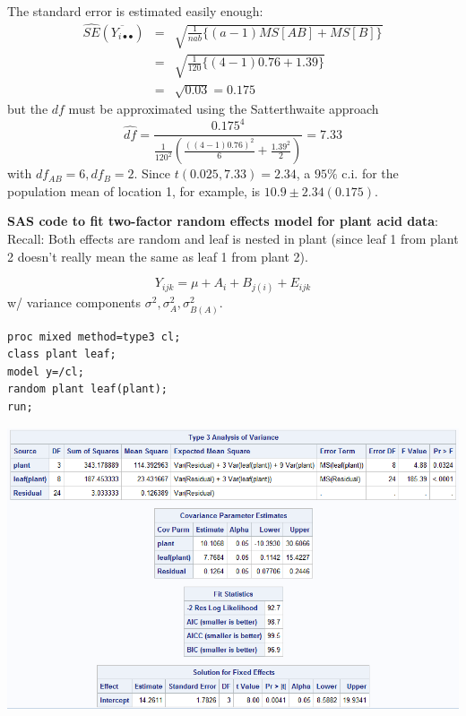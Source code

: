 The standard error is estimated easily enough:
\begin{eqnarray*}
\widehat{SE}(\overline{Y_{i\bullet\bullet}}) & = & \sqrt{\frac{1}{nab}\{(a-1)MS[AB] + MS[B]\}} \\
&=& \sqrt{\frac{1}{120}\{(4-1)0.76 + 1.39\}} \\
& = & \sqrt{0.03} = 0.175
\end{eqnarray*}
but the $df$ must be approximated using the Satterthwaite approach
$$ \hat{df} = \frac{0.175^4}{\frac{1}{120^2}\left(\frac{((4-1)0.76)^2}{6} + 
\frac{1.39^2}{2}\right)} = 7.33 $$
with $df_{AB}=6,df_{B}=2$.  Since $t(0.025,7.33)=2.34$, a $95\%$ c.i.  for
the population mean of location 1, for example, is $10.9 \pm 2.34 (0.175)$.

\newpage

\textbf{SAS code to fit two-factor random effects model for plant acid data}:\\
Recall:  Both effects are random and leaf is nested in plant (since leaf 1 from plant 2 doesn't really mean the same as leaf 1 from plant 2).

$$Y_{ijk} = \mu + A_i + B_{j(i)} + E_{ijk}$$
w/ variance components $\sigma^2,\sigma_A^2,\sigma_{B(A)}^2$.\\

\begin{small}
\begin{verbatim}
proc mixed method=type3 cl;
class plant leaf;
model y=/cl;
random plant leaf(plant);
run;
\end{verbatim}
\end{small}

\begin{center}
\includegraphics[scale=0.7]{Plant}
\end{center}

